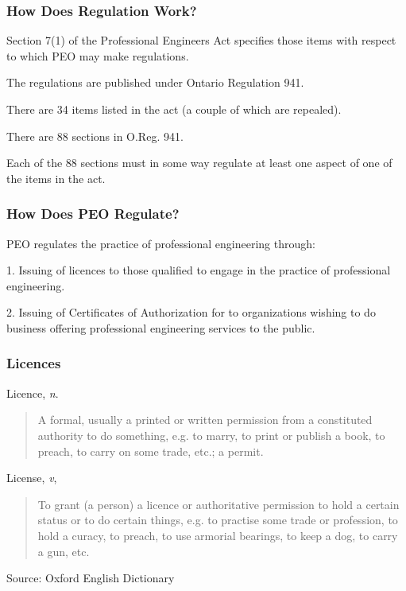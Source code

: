 \begin{frame}
\frametitle{How Does Regulation Work?}

Section 7(1) of the Professional Engineers Act specifies those items with respect to which PEO may make regulations.

The regulations are published under Ontario Regulation 941.

There are 34 items listed in the act (a couple of which are repealed).

There are 88 sections in O.Reg. 941.

Each of the 88 sections must in some way regulate at least one aspect of one of the items in the act.


\end{frame}


\begin{frame}
\frametitle{How Does PEO Regulate?}

PEO regulates the practice of professional engineering through:

1. Issuing of licences to those qualified to engage in the practice of professional engineering.

2. Issuing of Certificates of Authorization for to organizations wishing to do business offering professional engineering services to the public.


\end{frame}



\begin{frame}
\frametitle{Licences}

Licence, \textit{n}.
\begin{quote}
A formal, usually a printed or written permission from a constituted authority to do something, e.g. to marry, to print or publish a book, to preach, to carry on some trade, etc.; a permit.
\end{quote}

License, \textit{v},
\begin{quote}
To grant (a person) a licence or authoritative permission to hold a certain status or to do certain things, e.g. to practise some trade or profession, to hold a curacy, to preach, to use armorial bearings, to keep a dog, to carry a gun, etc.
\end{quote}

Source: Oxford English Dictionary

\end{frame}



